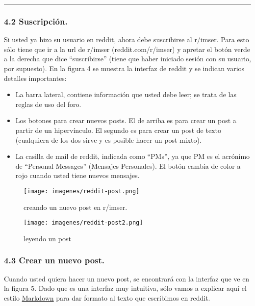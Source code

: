 \documentclass[]{article}
\makeatletter
\def\maxwidth{\ifdim\Gin@nat@width>\linewidth\linewidth
\else\Gin@nat@width\fi}
\let\Oldincludegraphics\includegraphics
\renewcommand{\includegraphics}[1]{\Oldincludegraphics[width=\maxwidth]{#1}}
\makeatother
\begin{document}
\begin{center}\rule{3in}{0.4pt}\end{center}

\subsubsection{4.2 Suscripción.}

Si usted ya hizo su usuario en reddit, ahora debe suscribirse al
r/imser. Para esto sólo tiene que ir a la url de r/imser
(reddit.com/r/imser) y apretar el botón verde a la derecha que dice
``suscribirse'' (tiene que haber iniciado sesión con su usuario, por
supuesto). En la figura 4 se muestra la interfaz de reddit y se indican
varios detalles importantes:

\begin{itemize}
\item
  La barra lateral, contiene información que usted debe leer; se trata
  de las reglas de uso del foro.
\item
  Los botones para crear nuevos posts. El de arriba es para crear un
  post a partir de un hipervínculo. El segundo es para crear un post de
  texto (cualquiera de los dos sirve y es posible hacer un post mixto).
\item
  La casilla de mail de reddit, indicada como ``PMs'', ya que PM es el
  acrónimo de ``Personal Messages'' (Mensajes Personales). El botón
  cambia de color a rojo cuando usted tiene nuevos mensajes.
\end{itemize}
\begin{figure}[htbp]
\centering
\texttt{[image: imagenes/reddit-post.png]}
\caption{creando un nuevo post en r/imser.}
\end{figure}

\begin{figure}[htbp]
\centering
\texttt{[image: imagenes/reddit-post2.png]}
\caption{leyendo un post}
\end{figure}

\subsubsection{4.3 Crear un nuevo post.}

Cuando usted quiera hacer un nuevo post, se encontrará con la interfaz
que ve en la figura 5. Dado que es una interfaz muy intuitiva, sólo
vamos a explicar aquí el estilo
\href{http://daringfireball.net/projects/markdown/syntax}{Markdown} para
dar formato al texto que escribimos en reddit.
\end{document}
